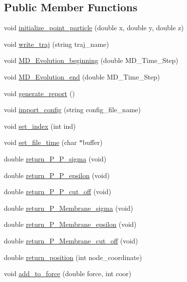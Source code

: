 \subsection*{Public Member Functions}
\begin{DoxyCompactItemize}
\item 
void \mbox{\hyperlink{classpoint__particle_a8019c456768e1fbe70d56bd3821b2906}{initialize\+\_\+point\+\_\+particle}} (double x, double y, double z)
\item 
void \mbox{\hyperlink{classpoint__particle_a584056fafe834e7346e266d1a950e731}{write\+\_\+traj}} (string traj\+\_\+name)
\item 
void \mbox{\hyperlink{classpoint__particle_a2dae1b70a2fbfdf4f95abeb086e90d23}{M\+D\+\_\+\+Evolution\+\_\+beginning}} (double M\+D\+\_\+\+Time\+\_\+\+Step)
\item 
void \mbox{\hyperlink{classpoint__particle_a9e5a00664604811b19ead1af25cdcb21}{M\+D\+\_\+\+Evolution\+\_\+end}} (double M\+D\+\_\+\+Time\+\_\+\+Step)
\item 
void \mbox{\hyperlink{classpoint__particle_a8a89ec34d7dc2e1a54c3e0b58d23ff06}{generate\+\_\+report}} ()
\item 
void \mbox{\hyperlink{classpoint__particle_a40db3a07bcbe9888fc538a469f8b0708}{import\+\_\+config}} (string config\+\_\+file\+\_\+name)
\item 
void \mbox{\hyperlink{classpoint__particle_a4bbc110dabefccd51143ed68d4d7ba3f}{set\+\_\+index}} (int ind)
\item 
void \mbox{\hyperlink{classpoint__particle_aba09dcc4858f07bb455e8de1a7423734}{set\+\_\+file\+\_\+time}} (char $\ast$buffer)
\item 
double \mbox{\hyperlink{classpoint__particle_afebd9502e8c8106f2b5274378045965c}{return\+\_\+\+P\+\_\+\+P\+\_\+sigma}} (void)
\item 
double \mbox{\hyperlink{classpoint__particle_acbec3803b347d96c064862102b059209}{return\+\_\+\+P\+\_\+\+P\+\_\+epsilon}} (void)
\item 
double \mbox{\hyperlink{classpoint__particle_a02ada7bba125dc701f5c8a4d067dc8c0}{return\+\_\+\+P\+\_\+\+P\+\_\+cut\+\_\+off}} (void)
\item 
double \mbox{\hyperlink{classpoint__particle_a51f76ba04a942622d54fb4e5388518a6}{return\+\_\+\+P\+\_\+\+Membrane\+\_\+sigma}} (void)
\item 
double \mbox{\hyperlink{classpoint__particle_ac2e3983a015b533b30209283a3692cc1}{return\+\_\+\+P\+\_\+\+Membrane\+\_\+epsilon}} (void)
\item 
double \mbox{\hyperlink{classpoint__particle_ae2d18d929b1558333ecd86b17f7caa6d}{return\+\_\+\+P\+\_\+\+Membrane\+\_\+cut\+\_\+off}} (void)
\item 
double \mbox{\hyperlink{classpoint__particle_a3785ab52126a3b9f4f9a38bd35378771}{return\+\_\+position}} (int node\+\_\+coordinate)
\item 
void \mbox{\hyperlink{classpoint__particle_aee14a82e8900194e3858fe19822725cd}{add\+\_\+to\+\_\+force}} (double force, int coor)
\end{DoxyCompactItemize}
